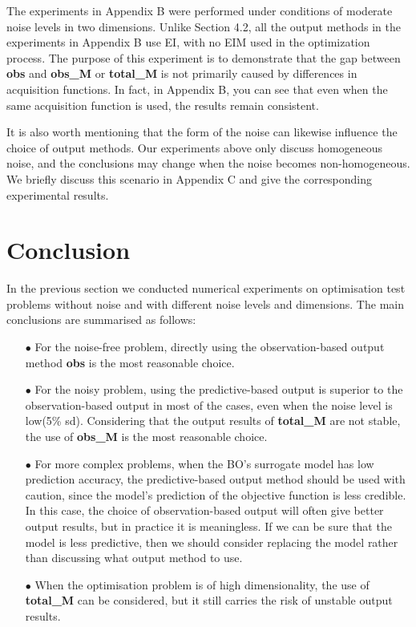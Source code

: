 \documentclass{article}
\begin{document}
\hspace{2em}The experiments in Appendix B were performed under conditions of moderate noise levels in two dimensions. Unlike Section 4.2, all the output methods in the experiments in Appendix B use EI, with no EIM used in the optimization process. The purpose of this experiment is to demonstrate that the gap between \textbf{obs} and \textbf{obs\_M} or \textbf{total\_M} is not primarily caused by differences in acquisition functions. In fact, in Appendix B, you can see that even when the same acquisition function is used, the results remain consistent.

\hspace{2em}It is also worth mentioning that the form of the noise can likewise influence the choice of output methods. Our experiments above only discuss homogeneous noise, and the conclusions may change when the noise becomes non-homogeneous. We briefly discuss this scenario in Appendix C and give the corresponding experimental results.



\section{Conclusion}

\hspace{2em}In the previous section we conducted numerical experiments on optimisation test problems without noise and with different noise levels and dimensions. The main conclusions are summarised as follows: 


\begin{itemize}[itemsep=2pt,topsep=0pt,parsep=0pt]
    \item[$\bullet$] For the noise-free problem, directly using the observation-based output method \textbf{obs} is the most reasonable choice. 
    \item[$\bullet$] For the noisy problem, using the predictive-based output is superior to the observation-based output in most of the cases, even when the noise level is low(5\% sd). Considering that the output results of \textbf{total\_M} are not stable, the use of \textbf{obs\_M} is the most reasonable choice.
    \item[$\bullet$] For more complex problems, when the BO's surrogate model has low prediction accuracy, the predictive-based output method should be used with caution, since the model's prediction of the objective function is less credible. In this case, the choice of observation-based output will often give better output results, but in practice it is meaningless. If we can be sure that the model is less predictive, then we should consider replacing the model rather than discussing what output method to use.
    \item[$\bullet$] When the optimisation problem is of high dimensionality, the use of \textbf{total\_M} can be considered, but it still carries the risk of unstable output results.  
       
    \end{itemize} 
\end{document}
